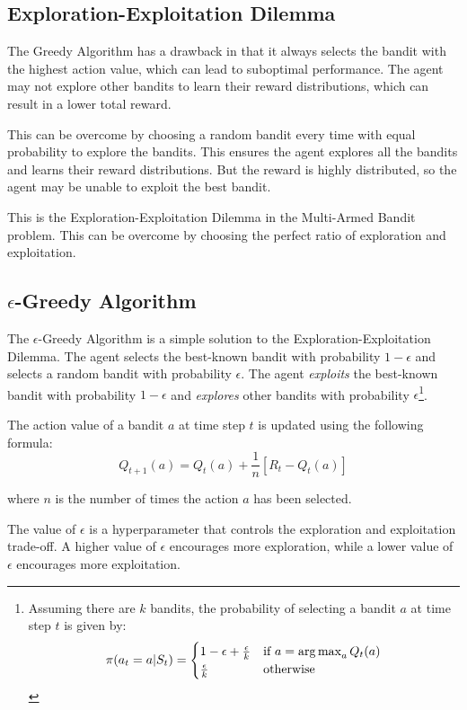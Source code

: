 \subsection{Exploration-Exploitation Dilemma}

The Greedy Algorithm has a drawback in that it always selects the bandit with the highest action value, which can lead to suboptimal performance. The agent may not explore other bandits to learn their reward distributions, which can result in a lower total reward.

This can be overcome by choosing a random bandit every time with equal probability to explore the bandits. This ensures the agent explores all the bandits and learns their reward distributions. But the reward is highly distributed, so the agent may be unable to exploit the best bandit.

This is the Exploration-Exploitation Dilemma in the Multi-Armed Bandit problem. This can be overcome by choosing the perfect ratio of exploration and exploitation.

\subsection{$\epsilon$-Greedy Algorithm}

The $\epsilon$-Greedy Algorithm is a simple solution to the Exploration-Exploitation Dilemma. The agent selects the best-known bandit with probability $1-\epsilon$ and selects a random bandit with probability $\epsilon$. The agent \textit{exploits} the best-known bandit with probability $1-\epsilon$ and \textit{explores} other bandits with probability $\epsilon$\footnote{Assuming there are $k$ bandits, the probability of selecting a bandit $a$ at time step $t$ is given by:
\[\pi(a_t=a|S_t) = \begin{cases}
    1-\epsilon + \frac{\epsilon}{k} & \text{if } a = \operatorname*{arg\,max}_{a} Q_t(a) \\ \frac{\epsilon}{k} & \text{otherwise}
\end{cases}\]}.

The action value of a bandit $a$ at time step $t$ is updated using the following formula:
\[Q_{t+1}(a) = Q_t(a) + \frac{1}{n}[R_t - Q_t(a)]\]

where $n$ is the number of times the action $a$ has been selected.

The value of $\epsilon$ is a hyperparameter that controls the exploration and exploitation trade-off. A higher value of $\epsilon$ encourages more exploration, while a lower value of $\epsilon$ encourages more exploitation.

